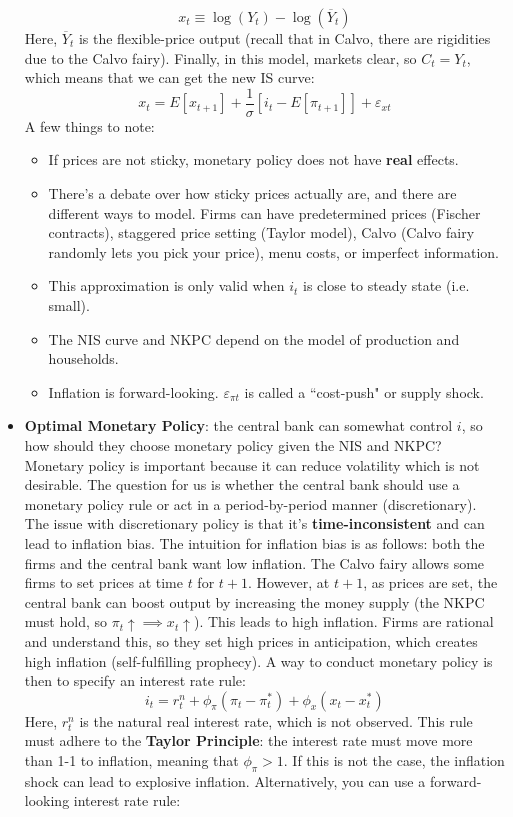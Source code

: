 \documentclass[12pt]{article}
\begin{document}
\begin{itemize}
    \[x_t \equiv \log(Y_t) - \log(\overline{Y}_t)\]
    Here, $\overline{Y}_t$ is the flexible-price output (recall that in Calvo, there are rigidities due to the Calvo fairy). Finally, in this model, markets clear, so $C_t = Y_t$, which means that we can get the new IS curve:
    \[x_t = E[x_{t+1}] + \frac{1}{\sigma}\left[i_t - E[\pi_{t+1}]\right]+ \varepsilon_{xt}\] 
    A few things to note:
    \begin{itemize}
        \item If prices are not sticky, monetary policy does not have \textbf{real} effects. 
        \item There's a debate over how sticky prices actually are, and there are different ways to model. Firms can have predetermined prices (Fischer contracts), staggered price setting (Taylor model), Calvo (Calvo fairy randomly lets you pick your price), menu costs, or imperfect information.
        \item This approximation is only valid when $i_t$ is close to steady state (i.e. small). 
        \item The NIS curve and NKPC depend on the model of production and households.
        \item Inflation is forward-looking. $\varepsilon_{\pi t}$ is called a ``cost-push" or supply shock. 
    \end{itemize}
    \item \textbf{Optimal Monetary Policy}: the central bank can somewhat control $i$, so how should they choose monetary policy given the NIS and NKPC? Monetary policy is important because it can reduce volatility which is not desirable. The question for us is whether the central bank should use a monetary policy rule or act in a period-by-period manner (discretionary). The issue with discretionary policy is that it's \textbf{time-inconsistent} and can lead to inflation bias. The intuition for inflation bias is as follows: both the firms and the central bank want low inflation. The Calvo fairy allows some firms to set prices at time $t$ for $t+1$. However, at $t+1$, as prices are set, the central bank can boost output by increasing the money supply (the NKPC must hold, so $\pi_t\uparrow \implies x_t\uparrow$). This leads to high inflation. Firms are rational and understand this, so they set high prices in anticipation, which creates high inflation (self-fulfilling prophecy). A way to conduct monetary policy is then to specify an interest rate rule:
    \[i_t = r_t^n + \phi_{\pi}(\pi_t - \pi_t^*) + \phi_x(x_t -x_t^*)\]
    Here, $r_t^n$ is the natural real interest rate, which is not observed. This rule must adhere to the \textbf{Taylor Principle}: the interest rate must move more than 1-1 to inflation, meaning that $\phi_{\pi} > 1$. If this is not the case, the inflation shock can lead to explosive inflation. Alternatively, you can use a forward-looking interest rate rule:

\end{itemize}
\end{document}

